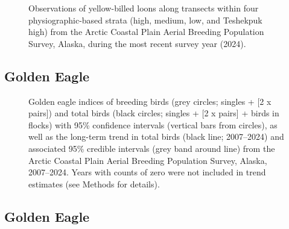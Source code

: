 \documentclass[
]{article}
\begin{document}
\begin{figure}


\caption{\label{fig-YBLOmap}Observations of yellow-billed loons along
transects within four physiographic-based strata (high, medium, low, and
Teshekpuk high) from the Arctic Coastal Plain Aerial Breeding Population
Survey, Alaska, during the most recent survey year (2024).}

\end{figure}%

\newpage{}

\subsection*{Golden Eagle}\label{golden-eagle}

\begin{figure}


\caption{\label{fig-GOEA}Golden eagle indices of breeding birds (grey
circles; singles + {[}2 x pairs{]}) and total birds (black circles;
singles + {[}2 x pairs{]} + birds in flocks) with 95\% confidence
intervals (vertical bars from circles), as well as the long-term trend
in total birds (black line; 2007--2024) and associated 95\% credible
intervals (grey band around line) from the Arctic Coastal Plain Aerial
Breeding Population Survey, Alaska, 2007--2024. Years with counts of
zero were not included in trend estimates (see Methods for details).}

\end{figure}%

\newpage{}

\subsection*{Golden Eagle}\label{golden-eagle-1}

\begingroup\fontsize{10}{12}\selectfont
\end{document}
